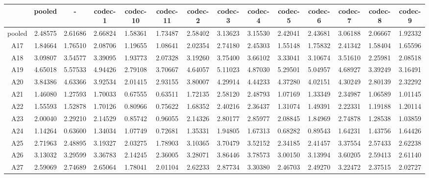 \begin{tabular}{cccccccccccccc}
    \toprule
           &  pooled  &    -     & codec-1  & codec-10 & codec-11 & codec-2  & codec-3  & codec-4  & codec-5  & codec-6  & codec-7  & codec-8  & codec-9 \\ 
    \midrule
    pooled &  2.48575 &  2.61686 &  2.66824 &  1.58361 &  1.73487 &  2.58402 &  3.13623 &  3.15530 &  2.42041 &  2.43681 &  3.06188 &  2.06667 &  1.92332\\ 
     A17   &  1.84664 &  1.76510 &  2.08706 &  1.19655 &  1.08641 &  2.02354 &  2.74180 &  2.45303 &  1.55148 &  1.75832 &  2.41342 &  1.58404 &  1.65596\\ 
     A18   &  3.09807 &  3.54577 &  3.39095 &  1.93773 &  2.07328 &  3.19260 &  3.75400 &  3.66102 &  3.33041 &  3.10674 &  3.51610 &  2.25981 &  2.08518\\ 
     A19   &  4.65018 &  5.57533 &  4.94426 &  2.79108 &  3.70667 &  4.64057 &  5.11023 &  4.87030 &  5.29501 &  5.04957 &  4.68927 &  3.39249 &  3.16491\\ 
     A20   &  3.84386 &  4.63366 &  3.92534 &  2.01415 &  2.93155 &  3.80007 &  4.29914 &  4.44233 &  4.37280 &  4.02151 &  4.30249 &  2.80139 &  2.32292\\ 
     A21   &  1.46080 &  1.27593 &  1.70033 &  0.67555 &  0.63511 &  1.72135 &  2.58120 &  2.48793 &  1.07169 &  1.33349 &  2.34987 &  1.06589 &  1.01145\\ 
     A22   &  1.55593 &  1.52878 &  1.70126 &  0.80966 &  0.75622 &  1.68352 &  2.40216 &  2.36437 &  1.31074 &  1.49391 &  2.22331 &  1.19188 &  1.20114\\ 
     A23   &  2.00040 &  2.29210 &  2.14529 &  0.85742 &  0.96055 &  2.14326 &  2.80177 &  2.85977 &  2.08845 &  1.84969 &  2.74878 &  1.28538 &  1.03859\\ 
     A24   &  1.14264 &  0.63600 &  1.34034 &  1.07749 &  0.72681 &  1.35331 &  1.94805 &  1.67313 &  0.68282 &  0.89543 &  1.64231 &  1.43756 &  1.64426\\ 
     A25   &  2.71963 &  2.48895 &  3.19327 &  2.03275 &  1.78903 &  3.10365 &  3.70479 &  3.52152 &  2.34185 &  2.41457 &  3.37554 &  2.57433 &  2.62238\\ 
     A26   &  3.13032 &  3.29599 &  3.36783 &  2.14245 &  2.36005 &  3.28071 &  3.86446 &  3.78573 &  3.00150 &  3.13994 &  3.60205 &  2.59413 &  2.61140\\ 
     A27   &  2.59069 &  2.74689 &  2.65064 &  1.78041 &  2.01104 &  2.62233 &  2.87734 &  3.30380 &  2.46703 &  2.49270 &  3.22472 &  2.37515 &  2.02727\\ 

\end{tabular}
